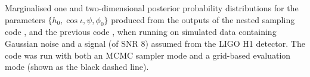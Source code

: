 \label{fig:simsignal_single}
Marginalised one and two-dimensional posterior probability distributions
for the parameters $\{h_0, \cos{\iota}, \psi, \phi_0\}$
produced from the outputs of the nested sampling code \lppen, and the previous
code \lppe, when running on simulated data containing Gaussian noise and a signal 
(of SNR 8) assumed from the LIGO H1 detector. The \lppe code was run with both an MCMC sampler mode and a grid-based
evaluation mode (shown as the black dashed line).
